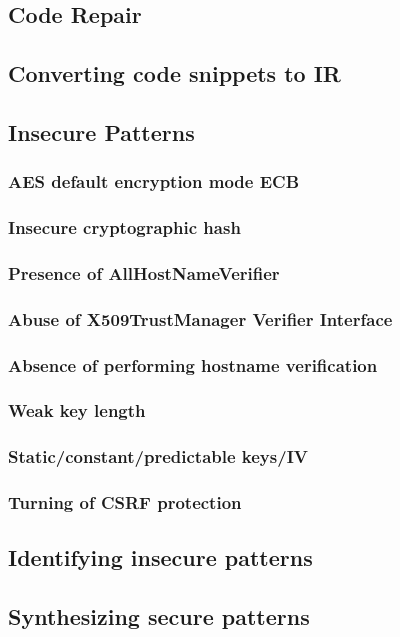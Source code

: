 \subsection{Code Repair}
\subsection{Converting code snippets to IR}
\subsection{Insecure Patterns}
\subsubsection{AES default encryption mode ECB }
\subsubsection{Insecure cryptographic hash}
\subsubsection{Presence of AllHostNameVerifier}
\subsubsection{Abuse of X509TrustManager Verifier Interface}
\subsubsection{Absence of performing hostname verification}
\subsubsection{Weak key length}
\subsubsection{Static/constant/predictable keys/IV }
\subsubsection{Turning of CSRF protection }
\subsection{Identifying insecure patterns}
\subsection{Synthesizing secure patterns}
